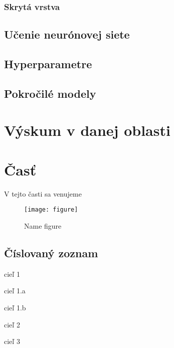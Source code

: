 \subsubsection{Skrytá vrstva}
\label{analyza_skryta_vrstva_nn}


\subsection{Učenie neurónovej siete}
\label{analyza_ucenie_nn}

\subsection{Hyperparametre}
\label{analyza_hyperparametre}


\subsection{Pokročilé modely}
\label{analyza_pokrocile_modely_nn}


\section{Výskum v danej oblasti}
\label{analyza_vyskum_danej_oblasti}












\section{Časť}
\label{sec:Časť}
V tejto časti sa venujeme 
\begin{figure}[H]
\begin{center}\texttt{[image: figure]}\end{center}
\caption[Name figure]{Name figure}\label{fig:figure}
\end{figure}

\subsection{Číslovaný zoznam}
\begin{my_enumerate}
	\item {cieľ 1}
	\begin{my_enumerate}
		\item {cieľ 1.a}
		\item {cieľ 1.b}
	\end{my_enumerate}
	\item {cieľ 2}
	\item {cieľ 3}
\end{my_enumerate}

